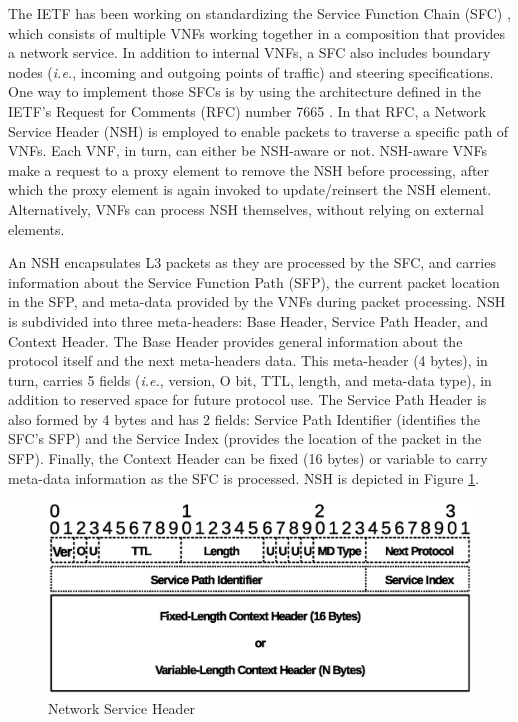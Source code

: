 The IETF has been working on standardizing the Service Function Chain (SFC) \cite{Joel-2015}, which consists of multiple VNFs working together in a composition that provides a network service. In addition to internal VNFs, a SFC also includes boundary nodes (\textit{i.e.},  incoming and outgoing points of traffic) and steering specifications. One way to implement those SFCs is by using the architecture defined in the IETF's Request for Comments (RFC) number 7665 \cite{Joel-2015}. In that RFC, a Network Service Header (NSH) \cite{Quinn-2018} is employed to enable packets to traverse a specific path of VNFs. Each VNF, in turn, can either be NSH-aware or not. NSH-aware VNFs make a request to a proxy element to remove the NSH before processing, after which the proxy element is again invoked to update/reinsert the NSH element. Alternatively, VNFs can process NSH themselves, without relying on external elements.

An NSH encapsulates L3 packets as they are processed by the SFC, and carries information about the Service Function Path (SFP), the current packet location in the SFP, and meta-data provided by the VNFs during packet processing.  NSH is subdivided into three meta-headers: Base Header, Service Path Header, and Context Header. The Base Header provides general information about the protocol itself and the next meta-headers data. This meta-header (4 bytes), in turn, carries 5 fields (\textit{i.e.}, version, O bit, TTL, length, and meta-data type), in addition to reserved space for future protocol use. The Service Path Header is also formed by 4 bytes and has 2 fields: Service Path Identifier (identifies the SFC's SFP) and the Service Index (provides the location of the packet in the SFP). Finally, the Context Header can be fixed (16 bytes) or variable to carry meta-data information as the SFC is processed. NSH is depicted in Figure \ref{FIG:NSH}.

\begin{figure}[!h]
\centering
\includegraphics[width=\linewidth]{images/NSH.eps}
\caption{Network Service Header}
\label{FIG:NSH}
\end{figure}

